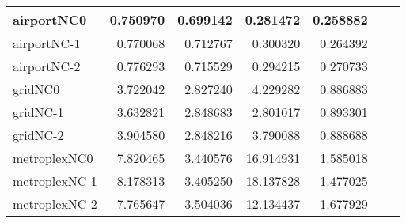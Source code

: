 \documentclass[../../../thesis.tex]{subfiles}
\begin{document}
\begin{longtable}{|l|r|r|r|r|r|r|}
airportNC0 & 0.750970 & 0.699142 & 0.281472 & 0.258882 \\ \hline
airportNC-1 & 0.770068 & 0.712767 & 0.300320 & 0.264392 \\ \hline
airportNC-2 & 0.776293 & 0.715529 & 0.294215 & 0.270733 \\ \hline
gridNC0 & 3.722042 & 2.827240 & 4.229282 & 0.886883 \\ \hline
gridNC-1 & 3.632821 & 2.848683 & 2.801017 & 0.893301 \\ \hline
gridNC-2 & 3.904580 & 2.848216 & 3.790088 & 0.888688 \\ \hline
metroplexNC0 & 7.820465 & 3.440576 & 16.914931 & 1.585018 \\ \hline
metroplexNC-1 & 8.178313 & 3.405250 & 18.137828 & 1.477025 \\ \hline
metroplexNC-2 & 7.765647 & 3.504036 & 12.134437 & 1.677929 \\ \hline
\end{longtable}
\end{document}
